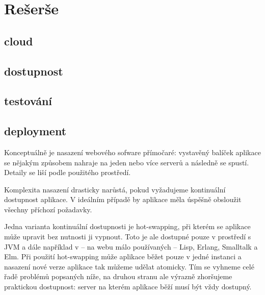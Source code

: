 \chapter{Rešerše}
    \blind[4]

    \section{cloud}
        \blind[2]

    \section{dostupnost}
        \blind[3]

    \section{testování}
        \blind[4]

    \section{deployment}
        \blind[1]

        Konceptuálně je nasazení webového sofware přímočaré: vystavěný balíček aplikace se nějakým způsobem nahraje na jeden nebo více serverů a následně se spustí. Detaily se liší podle použitého prostředí.

        Komplexita nasazení drasticky narůstá, pokud vyžadujeme kontinuální dostupnost aplikace. V ideálním případě by aplikace měla úspěšně obsloužit všechny příchozí požadavky.

        Jedna varianta kontinuální dostupnosti je hot-swapping, při kterém se aplikace může upravit bez nutnosti ji vypnout. Toto je ale dostupné pouze v prostředí s JVM a dále například v -- na webu málo používaných -- Lisp, Erlang, Smalltalk a Elm. Při použití hot-swapping může aplikace běžet pouze v jedné instanci a nasazení nové verze aplikace tak můžeme udělat atomicky. Tím se vyhneme celé řadě problémů popsaných níže, na druhou stranu ale výrazně zhoršujeme praktickou dostupnost: server na kterém aplikace běží musí být vždy dostupný.

